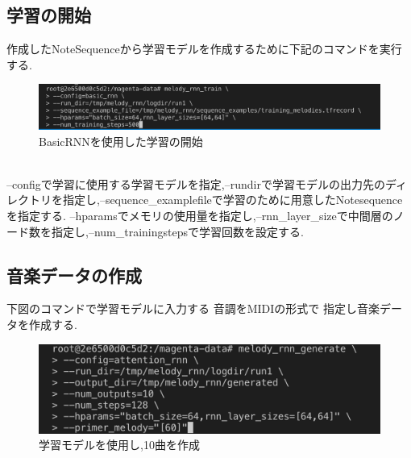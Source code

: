 \subsection{学習の開始}
作成したNoteSequenceから学習モデルを作成するために下記のコマンドを実行する.
\begin{figure}[!ht]
    \begin{screen}
    \begin{center}
        \includegraphics[scale=0.5, clip]{./img/Rnn_train.png}
        \caption{BasicRNNを使用した学習の開始}
        \label{fig:BasicRNNを使用した学習の開始}
    \end{center}
    \end{screen}
\end{figure}\\
--configで学習に使用する学習モデルを指定,--rundirで学習モデルの出力先のディレクトリを指定し,--sequence\_examplefileで学習のために用意したNotesequenceを指定する.
--hparamsでメモリの使用量を指定し,--rnn\_layer\_sizeで中間層のノード数を指定し,--num\_trainingstepsで学習回数を設定する.\\
\subsection{音楽データの作成}
下図のコマンドで学習モデルに入力する 音調をMIDIの形式で 指定し音楽データを作成する.
\begin{figure}[!ht]
    \begin{screen}
    \begin{center}
        \includegraphics[scale=0.7, clip]{./img/MIDI_make.png}
        \caption{学習モデルを使用し,10曲を作成}
        \label{fig:学習モデルを使用し,10曲を作成}
    \end{center}
    \end{screen}
\end{figure}